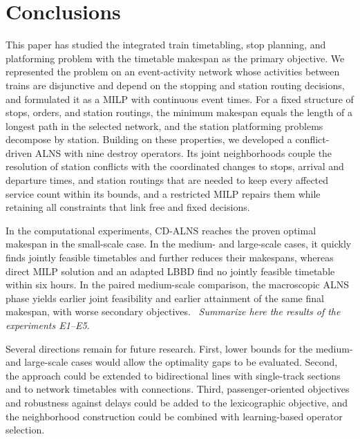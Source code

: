 \section{Conclusions}\label{sec:concl}
This paper has studied the integrated train timetabling, stop planning, and platforming problem with the timetable makespan as the primary objective. We represented the problem on an event-activity network whose activities between trains are disjunctive and depend on the stopping and station routing decisions, and formulated it as a MILP with continuous event times. For a fixed structure of stops, orders, and station routings, the minimum makespan equals the length of a longest path in the selected network, and the station platforming problems decompose by station. Building on these properties, we developed a conflict-driven ALNS with nine destroy operators. Its joint neighborhoods couple the resolution of station conflicts with the coordinated changes to stops, arrival and departure times, and station routings that are needed to keep every affected service count within its bounds, and a restricted MILP repairs them while retaining all constraints that link free and fixed decisions.

In the computational experiments, CD-ALNS reaches the proven optimal makespan in the small-scale case. In the medium- and large-scale cases, it quickly finds jointly feasible timetables and further reduces their makespans, whereas direct MILP solution and an adapted LBBD find no jointly feasible timetable within six hours. In the paired medium-scale comparison, the macroscopic ALNS phase yields earlier joint feasibility and earlier attainment of the same final makespan, with worse secondary objectives. \tbd~\textit{Summarize here the results of the experiments E1--E5.}

Several directions remain for future research. First, lower bounds for the medium- and large-scale cases would allow the optimality gaps to be evaluated. Second, the approach could be extended to bidirectional lines with single-track sections and to network timetables with connections. Third, passenger-oriented objectives and robustness against delays could be added to the lexicographic objective, and the neighborhood construction could be combined with learning-based operator selection.
